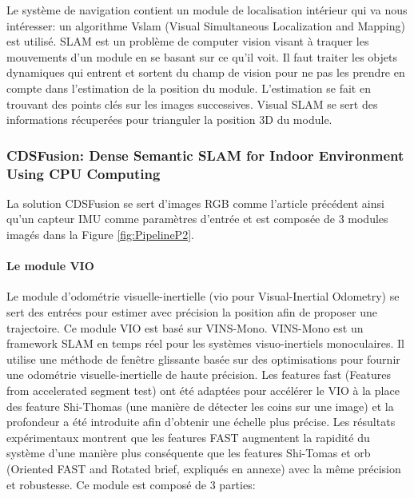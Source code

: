 \documentclass[11pt]{article}
\begin{document}
          Le système de navigation contient un module de localisation intérieur qui va nous intéresser: un algorithme V\acrshort{slam} (Visual Simultaneous 
          Localization and Mapping) est utilisé. SLAM est un problème de computer vision visant à traquer les mouvements d'un module en se basant
          sur ce qu'il voit. Il faut traiter les objets dynamiques qui entrent et sortent du champ de vision pour ne pas les prendre en compte
          dans l'estimation de la position du module. L'estimation se fait en trouvant des points clés sur les images successives.  Visual SLAM
          se sert des informations récuperées pour trianguler la position 3D du module. 
    
        \pagebreak

        \subsubsection{CDSFusion: Dense Semantic SLAM for Indoor Environment Using CPU Computing}
          La solution CDSFusion \cite{wangCDSFusionDenseSemantic2022} se sert d'images RGB comme l'article précédent ainsi qu'un capteur IMU comme paramètres d'entrée et est composée de 
          3 modules imagés dans la Figure \ref{fig:PipelineP2}.

          \paragraph{Le module VIO}
            Le module d'odométrie visuelle-inertielle (\acrshort{vio} pour Visual-Inertial Odometry) se sert des entrées pour estimer avec précision la position 
            afin de proposer une trajectoire. Ce module VIO est basé sur VINS-Mono. VINS-Mono est un framework SLAM en temps réel pour les 
            systèmes visuo-inertiels monoculaires. Il utilise une méthode de fenêtre glissante basée sur des optimisations pour fournir une odométrie 
            visuelle-inertielle de haute précision.
            Les features \acrshort{fast} (Features from accelerated segment test) ont été adaptées pour accélérer le VIO à 
            la place des feature Shi-Thomas (une manière de détecter les coins sur une image) et la profondeur a été introduite afin d'obtenir une échelle 
            plus précise. Les résultats expérimentaux montrent que les features FAST augmentent la rapidité du système d'une manière plus conséquente 
            que les features Shi-Tomas et \acrshort{orb} (Oriented FAST and Rotated \acrshort{brief}, expliqués en annexe) avec la même précision 
            et robustesse. Ce module est composé de 3 parties:
\end{document}
